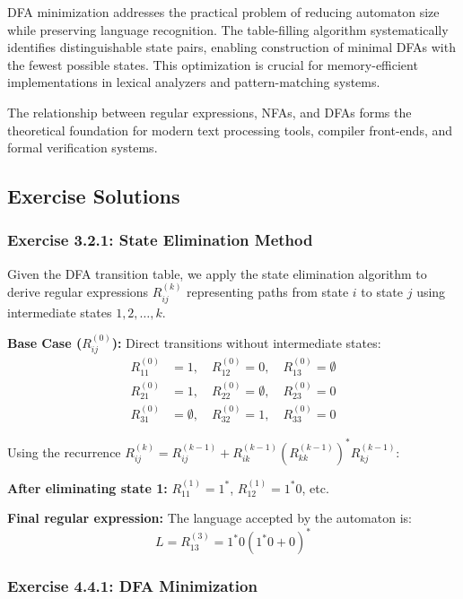 \documentclass{article}
\begin{document}
DFA minimization addresses the practical problem of reducing automaton size while preserving language recognition. The table-filling algorithm systematically identifies distinguishable state pairs, enabling construction of minimal DFAs with the fewest possible states. This optimization is crucial for memory-efficient implementations in lexical analyzers and pattern-matching systems.

The relationship between regular expressions, NFAs, and DFAs forms the theoretical foundation for modern text processing tools, compiler front-ends, and formal verification systems.

\subsection{Exercise Solutions}

\subsubsection{Exercise 3.2.1: State Elimination Method}

Given the DFA transition table, we apply the state elimination algorithm to derive regular expressions $R_{ij}^{(k)}$ representing paths from state $i$ to state $j$ using intermediate states $1, 2, \ldots, k$.

\textbf{Base Case ($R_{ij}^{(0)}$):} Direct transitions without intermediate states:
\begin{align}
R_{11}^{(0)} &= 1, \quad R_{12}^{(0)} = 0, \quad R_{13}^{(0)} = \emptyset \\
R_{21}^{(0)} &= 1, \quad R_{22}^{(0)} = \emptyset, \quad R_{23}^{(0)} = 0 \\
R_{31}^{(0)} &= \emptyset, \quad R_{32}^{(0)} = 1, \quad R_{33}^{(0)} = 0
\end{align}

Using the recurrence $R_{ij}^{(k)} = R_{ij}^{(k-1)} + R_{ik}^{(k-1)}(R_{kk}^{(k-1)})^*R_{kj}^{(k-1)}$:

\textbf{After eliminating state 1:}
$R_{11}^{(1)} = 1^*$, $R_{12}^{(1)} = 1^*0$, etc.

\textbf{Final regular expression:} The language accepted by the automaton is:
$$L = R_{13}^{(3)} = 1^*0(1^*0 + 0)^*$$

\subsubsection{Exercise 4.4.1: DFA Minimization}
\end{document}
